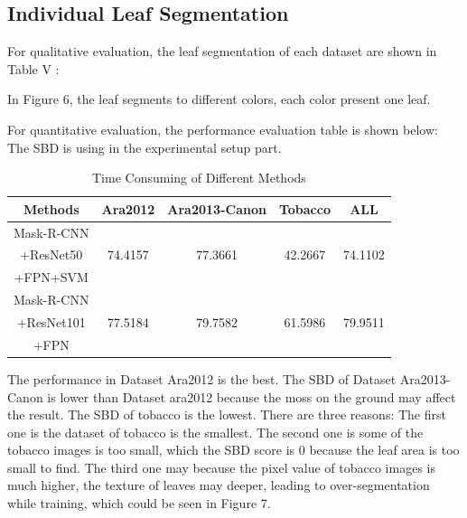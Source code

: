 \documentclass[conference]{IEEEtran}
\begin{document}
\subsection{Individual Leaf Segmentation}
For qualitative evaluation, the leaf segmentation of each dataset are shown in Table V : 

In Figure 6, the leaf segments to different colors, each color present one leaf.

For quantitative evaluation, the performance evaluation table is shown below: 
The SBD is using in the experimental setup part.

\begin{table}[htbp]
\caption{Time Consuming of Different Methods}
\begin{center}
\begin{tabular}{|c|c|c|c|c|}

\hline
Methods&Ara2012 &Ara2013-Canon&Tobacco&ALL \\
\hline
Mask-R-CNN &&&&\\
+ResNet50&74.4157 &77.3661&42.2667&74.1102  \\
+FPN+SVM &&&&\\
\hline
Mask-R-CNN&&&&\\
+ResNet101&77.5184&79.7582&61.5986&79.9511 \\
+FPN&&&&\\
\hline

\end{tabular}
\label{tab5}
\end{center}
\end{table}

The performance in Dataset Ara2012 is the best. The SBD of Dataset Ara2013-Canon is lower than Dataset ara2012 because the moss on the ground may affect the result. 
The SBD of tobacco is the lowest. There are three reasons:
The first one is the dataset of tobacco is the smallest. 
The second one is some of the tobacco images is too small, which the SBD score is 0 because the leaf area is too small to find.
The third one may because the pixel value of tobacco images is much higher, the texture of leaves may deeper, leading to over-segmentation while training, which could be seen in Figure 7.
\end{document}

